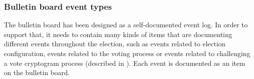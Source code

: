         



\subsubsection{Bulletin board event types} \label{sec: bulletin board event types}
The bulletin board has been designed as a self-documented event log. In order to support that, it needs to contain many kinds of items that are documenting different events throughout the election, such as events related to election configuration, events related to the voting process or events related to challenging a vote cryptogram process (described in ). Each event is documented as an item on the bulletin board.

